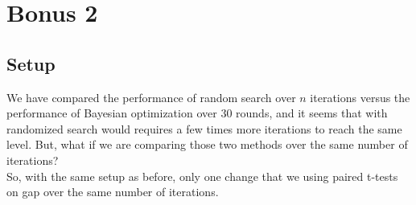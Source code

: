 \documentclass[12pt,a4paper]{article}
\begin{document}
\newpage
\section{Bonus 2}
\subsection{Setup}
We have compared the performance of random search over $n$ iterations versus the performance of Bayesian optimization over $30$ rounds, and it seems that with randomized search would requires a few times more iterations to reach the same level. But, what if we are comparing those two methods over the same number of iterations? \\
So, with the same setup as before, only one change that we using paired t-tests on gap over the same number of iterations.
\end{document}
